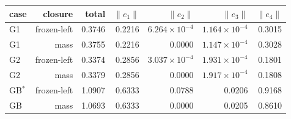 \begin{tabular}{lrrrrrr}
\toprule
case & closure & total & $\|e_1\|$ & $\|e_2\|$ & $\|e_3\|$ & $\|e_4\|$ \\
\midrule
G1 & frozen-left & 0.3746 & 0.2216 & $6.264\times10^{-4}$ & $1.164\times10^{-4}$ & 0.3015 \\
G1 & mass & 0.3755 & 0.2216 & 0.0000 & $1.147\times10^{-4}$ & 0.3028 \\
G2 & frozen-left & 0.3374 & 0.2856 & $3.037\times10^{-4}$ & $1.931\times10^{-4}$ & 0.1801 \\
G2 & mass & 0.3379 & 0.2856 & 0.0000 & $1.917\times10^{-4}$ & 0.1808 \\
GB$^{*}$ & frozen-left & 1.0907 & 0.6333 & 0.0788 & 0.0206 & 0.9168 \\
GB & mass & 1.0693 & 0.6333 & 0.0000 & 0.0205 & 0.8610 \\
\bottomrule
\end{tabular}
